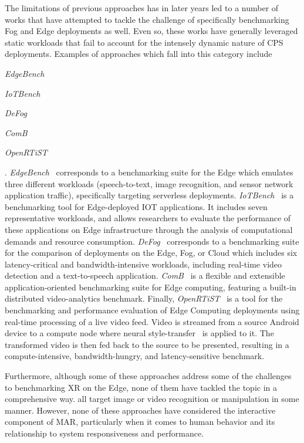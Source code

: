 The limitations of previous approaches has in later years led to a number of works that have attempted to tackle the challenge of specifically benchmarking Fog and Edge deployments as well.
Even so, these works have generally leveraged static workloads that fail to account for the intensely dynamic nature of \gls{CPS} deployments.
Examples of approaches which fall into this category include
\begin{inlineenum}
    \item \emph{EdgeBench}~\cite{das2018edgebench}
    \item \emph{IoTBench}~\cite{lee2019iotbench}
    \item \emph{DeFog}~\cite{mcchesney2019defog}
    \item \emph{ComB}~\cite{baurle2022comb}
    \item \emph{OpenRTiST}~\cite{george2020openrtist}
\end{inlineenum}.
\emph{EdgeBench}~\cite{das2018edgebench} corresponds to a benchmarking suite for the Edge which emulates three different workloads (speech-to-text, image recognition, and sensor network application traffic), specifically targeting serverless deployments.\@
\emph{IoTBench}~\cite{lee2019iotbench} is a benchmarking tool for Edge-deployed \gls{IOT} applications.
It includes seven representative workloads, and allows researchers to evaluate the performance of these applications on Edge infrastructure through the analysis of computational demands and resource consumption.\@
\emph{DeFog}~\cite{mcchesney2019defog} corresponds to a benchmarking suite for the comparison of deployments on the Edge, Fog, or Cloud which includes six latency-critical and bandwidth-intensive workloads, including real-time video detection and a text-to-speech application.
\emph{ComB}~\cite{baurle2022comb} is a flexible and extensible application-oriented benchmarking suite for Edge computing, featuring a built-in distributed video-analytics benchmark.
Finally, \emph{OpenRTiST}~\cite{george2020openrtist} is a tool for the benchmarking and performance evaluation of Edge Computing deployments using real-time processing of a live video feed.
Video is streamed from a source Android device to a compute node where neural style-transfer~\cite{gatys2016image} is applied to it.
The transformed video is then fed back to the source to be presented, resulting in a compute-intensive, bandwidth-hungry, and latency-sensitive benchmark.

Furthermore, although some of these approaches address some of the challenges to benchmarking \gls{XR} on the Edge, none of them have tackled the topic in a comprehensive way.\@
\cite{das2018edgebench,mcchesney2019defog,baurle2022comb,george2020openrtist} all target image or video recognition or manipulation in some manner.
However, none of these approaches have considered the interactive component of \gls{MAR}, particularly when it comes to human behavior and its relationship to system responsiveness and performance.

